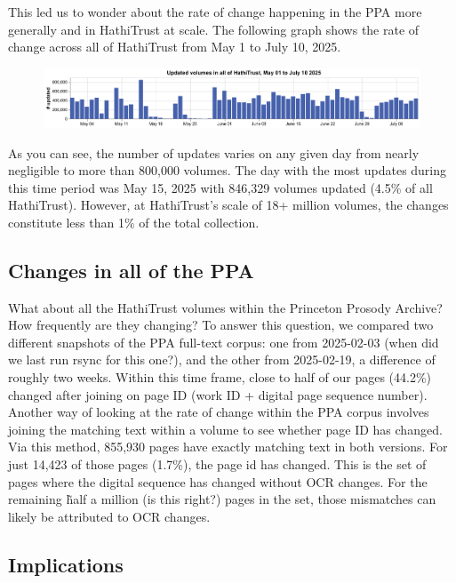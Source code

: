 \documentclass{anthology-ch}         %
\begin{document}
This led us to wonder about the rate of change happening in the PPA more generally and in HathiTrust at scale. The following graph shows the rate of change across all of HathiTrust from May 1 to July 10, 2025.
\begin{figure}
    \centering
    \includegraphics[width=1\linewidth]{figures/hathitrust_changes_countonly.pdf}
    \label{fig:hathi-bar-chart}
\end{figure}
As you can see, the number of updates varies on any given day from nearly negligible to more than 800,000 volumes. The day with the most updates during this time period was May 15, 2025 with 846,329 volumes updated (4.5\% of all HathiTrust).  However, at HathiTrust’s scale of 18+ million volumes, the changes constitute less than 1\% of the total collection. 

\subsection{Changes in all of the PPA}

What about all the HathiTrust volumes within the Princeton Prosody Archive? How frequently are they changing? To answer this question, we compared two different snapshots of the PPA full-text corpus: one from 2025-02-03 (when did we last run rsync for this one?), and the other from 2025-02-19, a difference of roughly two weeks. Within this time frame, close to half of our pages (44.2\%) changed after joining on page ID (work ID + digital page sequence number). Another way of looking at the rate of change within the PPA corpus involves joining the matching text within a volume to see whether page ID has changed. Via this method, 855,930 pages have exactly matching text in both versions. For just 14,423 of those pages (1.7\%), the page id has changed. This is the set of pages where the digital sequence has changed without OCR changes. For the remaining \~half a million (is this right?) pages in the set, those mismatches can likely be attributed to OCR changes.

\subsection{Implications}
\end{document}
